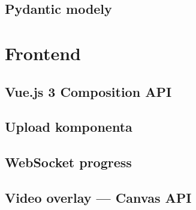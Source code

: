\subsection{Pydantic modely}


\section{Frontend}
\label{sec:frontend}


\subsection{Vue.js 3 Composition API}


\subsection{Upload komponenta}


\subsection{WebSocket progress}


\subsection{Video overlay --- Canvas API}

